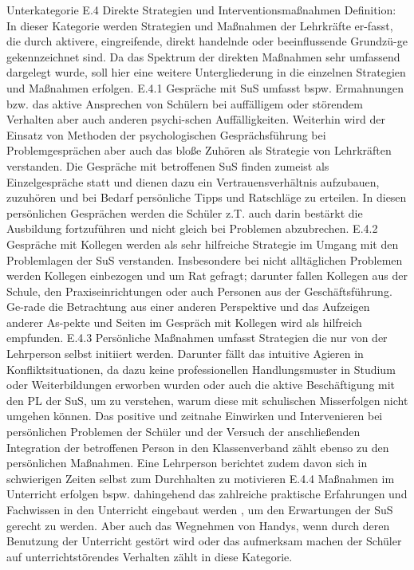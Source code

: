 Unterkategorie E.4 Direkte Strategien und Interventionsmaßnahmen
Definition: In dieser Kategorie werden Strategien und Maßnahmen der Lehrkräfte er-fasst, die durch aktivere, eingreifende, direkt handelnde oder beeinflussende Grundzü-ge gekennzeichnet sind. Da das Spektrum der direkten Maßnahmen sehr umfassend dargelegt wurde, soll hier eine weitere Untergliederung in die einzelnen Strategien und Maßnahmen erfolgen.
E.4.1 Gespräche mit SuS umfasst bspw. Ermahnungen  bzw. das aktive Ansprechen von Schülern bei auffälligem oder störendem Verhalten aber auch anderen psychi-schen Auffälligkeiten. Weiterhin wird der Einsatz von Methoden der psychologischen Gesprächsführung bei Problemgesprächen aber auch das bloße Zuhören als Strategie von Lehrkräften verstanden. Die Gespräche mit betroffenen SuS finden zumeist als Einzelgespräche statt und dienen dazu ein Vertrauensverhältnis aufzubauen, zuzuhören und bei Bedarf persönliche Tipps und Ratschläge zu erteilen. In diesen persönlichen Gesprächen werden die Schüler z.T. auch darin bestärkt die Ausbildung fortzuführen und nicht gleich bei Problemen abzubrechen.
E.4.2 Gespräche mit Kollegen werden als sehr hilfreiche Strategie im Umgang mit den Problemlagen der SuS verstanden. Insbesondere bei nicht alltäglichen Problemen werden Kollegen einbezogen und um Rat gefragt; darunter fallen Kollegen aus der Schule, den Praxiseinrichtungen oder auch Personen aus der Geschäftsführung. Ge-rade die Betrachtung aus einer anderen Perspektive und das Aufzeigen anderer As-pekte und Seiten im Gespräch mit Kollegen wird als hilfreich empfunden.
E.4.3 Persönliche Maßnahmen umfasst Strategien die nur von der Lehrperson selbst initiiert werden. Darunter fällt das intuitive Agieren in Konfliktsituationen, da dazu keine professionellen Handlungsmuster in Studium oder Weiterbildungen erworben wurden oder auch die aktive Beschäftigung mit den PL der SuS, um zu verstehen, warum diese mit schulischen Misserfolgen nicht umgehen können. Das positive und zeitnahe Einwirken und Intervenieren bei persönlichen Problemen der Schüler und der Versuch der anschließenden Integration der betroffenen Person in den Klassenverband zählt ebenso zu den persönlichen Maßnahmen. Eine Lehrperson berichtet zudem davon sich in schwierigen Zeiten selbst zum Durchhalten zu motivieren 
E.4.4 Maßnahmen im Unterricht erfolgen bspw. dahingehend das zahlreiche praktische Erfahrungen und Fachwissen in den Unterricht eingebaut werden
, um den Erwartungen der SuS gerecht zu werden. Aber auch das Wegnehmen von Handys, wenn durch deren Benutzung der Unterricht gestört wird oder das aufmerksam machen der Schüler auf unterrichtstörendes Verhalten zählt in diese Kategorie.
